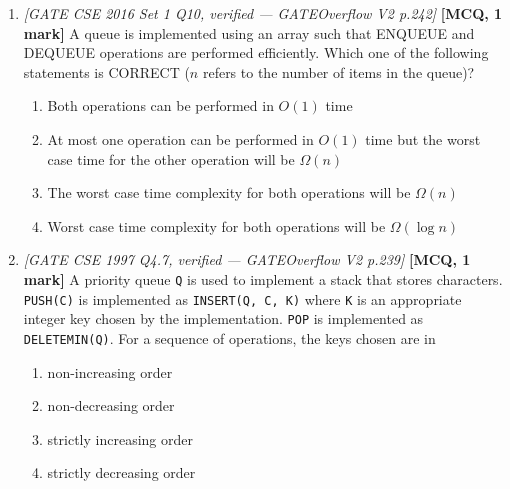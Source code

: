 \documentclass[11pt]{article}
\begin{document}
\begin{enumerate}
\item[\textbf{Q3}] \textit{[GATE CSE 2016 Set 1 Q10, verified --- GATEOverflow V2 p.242]} \textbf{[MCQ, 1 mark]} A queue is implemented using an array such that ENQUEUE and DEQUEUE operations are performed efficiently. Which one of the following statements is CORRECT ($n$ refers to the number of items in the queue)?
\begin{enumerate}
  \item[(A)] Both operations can be performed in $O(1)$ time
  \item[(B)] At most one operation can be performed in $O(1)$ time but the worst case time for the other operation will be $\Omega(n)$
  \item[(C)] The worst case time complexity for both operations will be $\Omega(n)$
  \item[(D)] Worst case time complexity for both operations will be $\Omega(\log n)$
\end{enumerate}

\item[\textbf{Q4}] \textit{[GATE CSE 1997 Q4.7, verified --- GATEOverflow V2 p.239]} \textbf{[MCQ, 1 mark]} A priority queue \texttt{Q} is used to implement a stack that stores characters. \texttt{PUSH(C)} is implemented as \texttt{INSERT(Q, C, K)} where \texttt{K} is an appropriate integer key chosen by the implementation. \texttt{POP} is implemented as \texttt{DELETEMIN(Q)}. For a sequence of operations, the keys chosen are in
\begin{enumerate}
  \item[(A)] non-increasing order
  \item[(B)] non-decreasing order
  \item[(C)] strictly increasing order
  \item[(D)] strictly decreasing order
\end{enumerate}


\end{enumerate}
\end{document}
